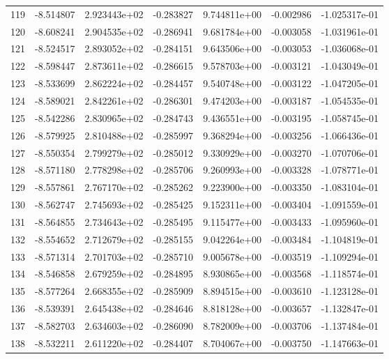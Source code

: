 \begin{tabular}{rrrrrrr}
 119 &  -8.514807 &  2.923443e+02 & -0.283827 &  9.744811e+00 &  -0.002986 & -1.025317e-01 \\
 120 &  -8.608241 &  2.904535e+02 & -0.286941 &  9.681784e+00 &  -0.003058 & -1.031961e-01 \\
 121 &  -8.524517 &  2.893052e+02 & -0.284151 &  9.643506e+00 &  -0.003053 & -1.036068e-01 \\
 122 &  -8.598447 &  2.873611e+02 & -0.286615 &  9.578703e+00 &  -0.003121 & -1.043049e-01 \\
 123 &  -8.533699 &  2.862224e+02 & -0.284457 &  9.540748e+00 &  -0.003122 & -1.047205e-01 \\
 124 &  -8.589021 &  2.842261e+02 & -0.286301 &  9.474203e+00 &  -0.003187 & -1.054535e-01 \\
 125 &  -8.542286 &  2.830965e+02 & -0.284743 &  9.436551e+00 &  -0.003195 & -1.058745e-01 \\
 126 &  -8.579925 &  2.810488e+02 & -0.285997 &  9.368294e+00 &  -0.003256 & -1.066436e-01 \\
 127 &  -8.550354 &  2.799279e+02 & -0.285012 &  9.330929e+00 &  -0.003270 & -1.070706e-01 \\
 128 &  -8.571180 &  2.778298e+02 & -0.285706 &  9.260993e+00 &  -0.003328 & -1.078771e-01 \\
 129 &  -8.557861 &  2.767170e+02 & -0.285262 &  9.223900e+00 &  -0.003350 & -1.083104e-01 \\
 130 &  -8.562747 &  2.745693e+02 & -0.285425 &  9.152311e+00 &  -0.003404 & -1.091559e-01 \\
 131 &  -8.564855 &  2.734643e+02 & -0.285495 &  9.115477e+00 &  -0.003433 & -1.095960e-01 \\
 132 &  -8.554652 &  2.712679e+02 & -0.285155 &  9.042264e+00 &  -0.003484 & -1.104819e-01 \\
 133 &  -8.571314 &  2.701703e+02 & -0.285710 &  9.005678e+00 &  -0.003519 & -1.109294e-01 \\
 134 &  -8.546858 &  2.679259e+02 & -0.284895 &  8.930865e+00 &  -0.003568 & -1.118574e-01 \\
 135 &  -8.577264 &  2.668355e+02 & -0.285909 &  8.894515e+00 &  -0.003610 & -1.123128e-01 \\
 136 &  -8.539391 &  2.645438e+02 & -0.284646 &  8.818128e+00 &  -0.003657 & -1.132847e-01 \\
 137 &  -8.582703 &  2.634603e+02 & -0.286090 &  8.782009e+00 &  -0.003706 & -1.137484e-01 \\
 138 &  -8.532211 &  2.611220e+02 & -0.284407 &  8.704067e+00 &  -0.003750 & -1.147663e-01 \\

\end{tabular}
